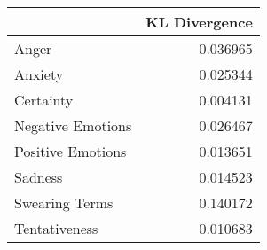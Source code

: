 \begin{tabular}{lr}
\toprule
{} &  KL Divergence \\
\midrule
Anger             &       0.036965 \\
Anxiety           &       0.025344 \\
Certainty         &       0.004131 \\
Negative Emotions &       0.026467 \\
Positive Emotions &       0.013651 \\
Sadness           &       0.014523 \\
Swearing Terms    &       0.140172 \\
Tentativeness     &       0.010683 \\
\bottomrule
\end{tabular}
